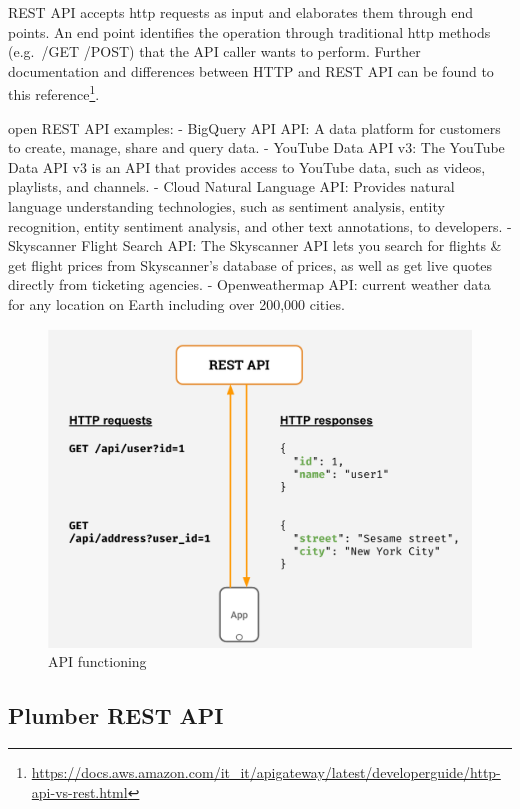 \documentclass[
  12pt,
  a4paper,
  oneside]{book}
\DeclareRobustCommand{\href}[2]{#2\footnote{\url{#1}}}
\theoremstyle{definition}
\theoremstyle{definition}
\theoremstyle{definition}
\theoremstyle{remark}
\begin{document}
REST API accepts http requests as input and elaborates them through end points. An end point identifies the operation through traditional http methods (e.g.~/GET /POST) that the API caller wants to perform. Further documentation and differences between HTTP and REST API can be found to this \href{https://docs.aws.amazon.com/it_it/apigateway/latest/developerguide/http-api-vs-rest.html}{reference}.

open REST API examples:
- BigQuery API API: A data platform for customers to create, manage, share and query data.
- YouTube Data API v3: The YouTube Data API v3 is an API that provides access to YouTube data, such as videos, playlists, and channels.
- Cloud Natural Language API: Provides natural language understanding technologies, such as sentiment analysis, entity recognition, entity sentiment analysis, and other text annotations, to developers.
- Skyscanner Flight Search API: The Skyscanner API lets you search for flights \& get flight prices from Skyscanner's database of prices, as well as get live quotes directly from ticketing agencies.
- Openweathermap API: current weather data for any location on Earth including over 200,000 cities.

\begin{figure}
\centering
\includegraphics{images/Rest-API.png}
\caption{API functioning}
\end{figure}

\hypertarget{plumberapi}{%
\subsection{Plumber REST API}\label{plumberapi}}
\end{document}
